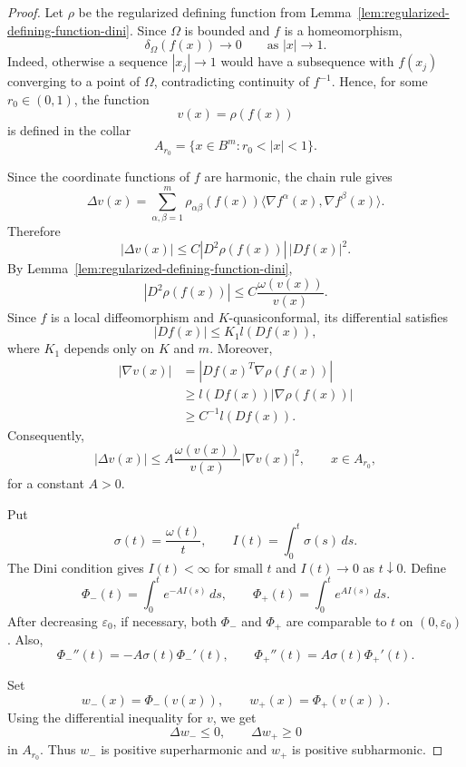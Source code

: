 \documentclass[11pt]{amsart}
\theoremstyle{definition}
\theoremstyle{remark}
\begin{document}
\begin{proof}
Let \(\rho\) be the regularized defining function from
Lemma~\ref{lem:regularized-defining-function-dini}. Since \(\Omega\) is
bounded and \(f\) is a homeomorphism,
\[
        \delta_\Omega(f(x))\to0
        \qquad\text{as } |x|\to1.
\]
Indeed, otherwise a sequence \(|x_j|\to1\) would have a subsequence with
\(f(x_j)\) converging to a point of \(\Omega\), contradicting continuity of
\(f^{-1}\).  Hence, for some \(r_0\in(0,1)\), the function
\[
        v(x)=\rho(f(x))
\]
is defined in the collar
\[
        A_{r_0}=\{x\in B^m:r_0<|x|<1\}.
\]

Since the coordinate functions of \(f\) are harmonic, the chain rule gives
\[
        \Delta v(x)
        =
        \sum_{\alpha,\beta=1}^m
        \rho_{\alpha\beta}(f(x))
        \langle \nabla f^\alpha(x),\nabla f^\beta(x)\rangle .
\]
Therefore
\[
        |\Delta v(x)|
        \le
        C |D^2\rho(f(x))|\,|Df(x)|^2 .
\]
By Lemma~\ref{lem:regularized-defining-function-dini},
\[
        |D^2\rho(f(x))|
        \le
        C\frac{\omega(v(x))}{v(x)}.
\]
Since \(f\) is a local diffeomorphism and \(K\)-quasiconformal, its
differential satisfies
\[
        |Df(x)|\le K_1 l(Df(x)),
\]
where \(K_1\) depends only on \(K\) and \(m\).  Moreover,
\[
\begin{aligned}
        |\nabla v(x)|
        &=|Df(x)^T\nabla\rho(f(x))|       \\
        &\ge l(Df(x))|\nabla\rho(f(x))|  \\
        &\ge C^{-1}l(Df(x)).
\end{aligned}
\]
Consequently,
\[
        |\Delta v(x)|
        \le
        A\frac{\omega(v(x))}{v(x)}|\nabla v(x)|^2,
        \qquad x\in A_{r_0},
\]
for a constant \(A>0\).

Put
\[
        \sigma(t)=\frac{\omega(t)}{t},
        \qquad
        I(t)=\int_0^t \sigma(s)\,ds.
\]
The Dini condition gives \(I(t)<\infty\) for small \(t\) and
\(I(t)\to0\) as \(t\downarrow0\).  Define
\[
        \Phi_-(t)=\int_0^t e^{-AI(s)}\,ds,
        \qquad
        \Phi_+(t)=\int_0^t e^{AI(s)}\,ds .
\]
After decreasing \(\varepsilon_0\), if necessary, both \(\Phi_-\) and
\(\Phi_+\) are comparable to \(t\) on \((0,\varepsilon_0)\).  Also,
\[
        \Phi_-''(t)=-A\sigma(t)\Phi_-'(t),
        \qquad
        \Phi_+''(t)=A\sigma(t)\Phi_+'(t).
\]

Set
\[
        w_-(x)=\Phi_-(v(x)),
        \qquad
        w_+(x)=\Phi_+(v(x)).
\]
Using the differential inequality for \(v\), we get
\[
        \Delta w_-\le0,
        \qquad
        \Delta w_+\ge0
\]
in \(A_{r_0}\).  Thus \(w_-\) is positive superharmonic and \(w_+\) is
positive subharmonic.



\end{proof}
\end{document}
